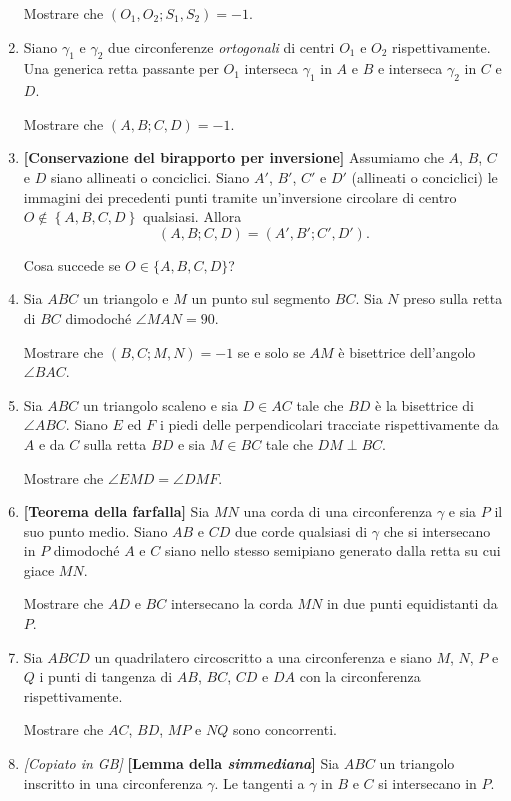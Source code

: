 \begin{enumerate}
	Mostrare che $(O_1,O_2;S_1,S_2)=-1$.	
	\item Siano $\gamma_1$ e $\gamma_2$ due circonferenze \textit{ortogonali} di centri $O_1$ e $O_2$ rispettivamente. Una generica retta passante per $O_1$ interseca $\gamma_1$ in $A$ e $B$ e interseca $\gamma_2$ in $C$ e $D$.
	
	Mostrare che $(A,B;C,D)=-1$.
	\item \textbf{[Conservazione del birapporto per inversione]} Assumiamo che $A$, $B$, $C$ e $D$ siano allineati o conciclici. Siano $A'$, $B'$, $C'$ e $D'$ (allineati o conciclici) le immagini dei precedenti punti tramite un'inversione circolare di centro $O\notin\left\{A,B,C,D\right\}$  qualsiasi. Allora
	\begin{equation}
	(A,B;C,D)=(A',B';C',D').
	\end{equation}
	
	Cosa succede se $O\in \{A,B,C,D\}$?
	
    \item Sia $ABC$ un triangolo e $M$ un punto sul segmento $BC$. Sia $N$ preso sulla retta di $BC$ dimodoché $\angle MAN=90$.
    
    Mostrare che $(B,C;M,N)=-1$ se e solo se $AM$ è bisettrice dell'angolo $\angle{BAC}$.
    \item Sia $ABC$ un triangolo scaleno e sia $D \in AC$ tale che $BD$ è la bisettrice di $\angle ABC$.
    Siano $E$ ed $F$ i piedi delle perpendicolari tracciate rispettivamente da $A$ e da $C$ sulla retta $BD$ e
    sia $M \in BC$ tale che $DM \perp BC$.
    
    Mostrare che $\angle EMD=\angle DMF$.
    \item \textbf{[Teorema della farfalla]} Sia $MN$ una corda di una circonferenza $\gamma$ e sia $P$ il suo punto medio. Siano $AB$ e $CD$ due corde qualsiasi di $\gamma$ che si intersecano in $P$ dimodoché $A$ e $C$ siano nello stesso semipiano generato dalla retta su cui giace $MN$. 
    
    Mostrare che $AD$ e $BC$ intersecano la corda $MN$ in due punti equidistanti da $P$. 
    \item Sia $ABCD$ un quadrilatero circoscritto a una circonferenza e siano $M$, $N$, $P$ e $Q$ i punti di tangenza di $AB$, $BC$, $CD$ e $DA$ con la circonferenza rispettivamente. 
    
    Mostrare che $AC$, $BD$, $MP$ e $NQ$ sono concorrenti.
    \item \emph{[Copiato in GB]} \textbf{[Lemma della \textit{simmediana}]} Sia $ABC$ un triangolo inscritto in una circonferenza $\gamma$. Le tangenti a $\gamma$ in $B$ e $C$ si intersecano in $P$.
    

\end{enumerate}
